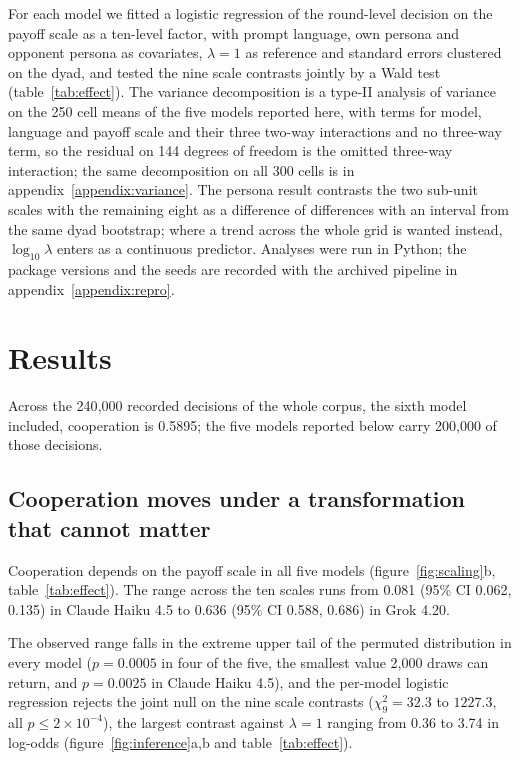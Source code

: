 \documentclass[openacc]{rsproca_new}
\newcommand{\lam}{\lambda}
\newcommand{\ci}[2]{(95\% CI #1, #2)}
\begin{document}
For each model we fitted a logistic regression of the round-level decision on
the payoff scale as a ten-level factor, with prompt language, own persona and
opponent persona as covariates, $\lam = 1$ as reference and standard errors
clustered on the dyad, and tested the nine scale contrasts jointly by a Wald
test (table~\ref{tab:effect}). The variance decomposition is a type-II analysis
of variance on the 250 cell means of the five models reported here, with terms
for model, language and payoff scale and their three two-way interactions and
no three-way term, so the residual on 144 degrees of freedom is the omitted
three-way interaction; the same decomposition on all 300 cells is in
appendix~\ref{appendix:variance}. The persona result contrasts the two
sub-unit scales with the remaining eight as a difference of differences with an
interval from the same dyad bootstrap; where a trend across the whole grid is
wanted instead, $\log_{10}\lam$ enters as a continuous predictor. Analyses were
run in Python; the package versions and the seeds are recorded with the
archived pipeline in appendix~\ref{appendix:repro}.


\section{Results}\label{sec:results}

Across the 240{,}000 recorded decisions of the whole corpus, the sixth model
included, cooperation is 0.5895; the five models reported below carry 200{,}000
of those decisions.

\subsection{Cooperation moves under a transformation that cannot matter}\label{sec:payoff_magnitude}

Cooperation depends on the payoff scale in all five models
(figure~\ref{fig:scaling}b, table~\ref{tab:effect}). The range across the ten
scales runs from 0.081 \ci{0.062}{0.135} in Claude Haiku 4.5 to 0.636
\ci{0.588}{0.686} in Grok 4.20.

The observed range falls in the extreme upper tail of the permuted distribution
in every model ($p = 0.0005$ in four of the five, the smallest value 2{,}000
draws can return, and $p = 0.0025$ in Claude Haiku 4.5), and the per-model
logistic regression rejects the joint null on the nine scale contrasts
($\chi^2_9 = 32.3$ to $1227.3$, all $p \leq 2\times10^{-4}$), the largest
contrast against $\lam = 1$ ranging from 0.36 to 3.74 in log-odds
(figure~\ref{fig:inference}a,b and table~\ref{tab:effect}).
\end{document}
